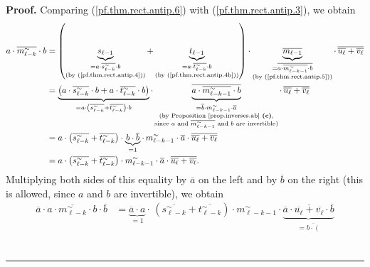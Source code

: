 \documentclass[numbers=enddot,12pt,final,onecolumn,notitlepage]{scrartcl}%
\theoremstyle{definition}
\newenvironment{verlong}{}{}
\newenvironment{proof}[1][Proof]{\noindent\textbf{#1.} }{\ \rule{0.5em}{0.5em}}
\begin{document}
\begin{verlong}
\begin{proof}
Comparing (\ref{pf.thm.rect.antip.6}) with (\ref{pf.thm.rect.antip.3}), we
obtain%
\begin{align*}
a\cdot\overline{m_{\ell-k}^{\sim}}\cdot b  &  =\left(  \underbrace{s_{\ell-1}%
}_{\substack{=a\cdot\overline{s_{\ell-k}^{\sim}}\cdot b\\\text{(by
(\ref{pf.thm.rect.antip.4}))}}}+\underbrace{t_{\ell-1}}_{\substack{=a\cdot
\overline{t_{\ell-k}^{\sim}}\cdot b\\\text{(by (\ref{pf.thm.rect.antip.4b}))}%
}}\right)  \cdot\underbrace{\overline{m_{\ell-1}}}_{\substack{=\overline
{a\cdot\overline{m_{\ell-k-1}^{\sim}}\cdot b}\\\text{(by
(\ref{pf.thm.rect.antip.5}))}}}\cdot\,\overline{\overline{u_{\ell}}%
+\overline{v_{\ell}}}\\
&  =\underbrace{\left(  a\cdot\overline{s_{\ell-k}^{\sim}}\cdot b+a\cdot
\overline{t_{\ell-k}^{\sim}}\cdot b\right)  }_{=a\cdot\left(  \overline
{s_{\ell-k}^{\sim}}+\overline{t_{\ell-k}^{\sim}}\right)  \cdot b}%
\cdot\underbrace{\overline{a\cdot\overline{m_{\ell-k-1}^{\sim}}\cdot b}%
}_{\substack{=\overline{b}\cdot m_{\ell-k-1}^{\sim}\cdot\overline
{a}\\\text{(by Proposition \ref{prop.inverses.ab} \textbf{(c)},}\\\text{since
}a\text{ and }\overline{m_{\ell-k-1}^{\sim}}\text{ and }b\text{ are
invertible)}}}\cdot\,\overline{\overline{u_{\ell}}+\overline{v_{\ell}}}\\
&  =a\cdot\left(  \overline{s_{\ell-k}^{\sim}}+\overline{t_{\ell-k}^{\sim}%
}\right)  \cdot\underbrace{b\cdot\overline{b}}_{=1}\cdot\,m_{\ell-k-1}^{\sim
}\cdot\overline{a}\cdot\overline{\overline{u_{\ell}}+\overline{v_{\ell}}}\\
&  =a\cdot\left(  \overline{s_{\ell-k}^{\sim}}+\overline{t_{\ell-k}^{\sim}%
}\right)  \cdot m_{\ell-k-1}^{\sim}\cdot\overline{a}\cdot\overline
{\overline{u_{\ell}}+\overline{v_{\ell}}}.
\end{align*}
Multiplying both sides of this equality by $\overline{a}$ on the left and by
$\overline{b}$ on the right (this is allowed, since $a$ and $b$ are
invertible), we obtain%
\begin{align*}
\overline{a}\cdot a\cdot\overline{m_{\ell-k}^{\sim}}\cdot b\cdot\overline{b}
&  =\underbrace{\overline{a}\cdot a}_{=1}\cdot\,\left(  \overline{s_{\ell
-k}^{\sim}}+\overline{t_{\ell-k}^{\sim}}\right)  \cdot m_{\ell-k-1}^{\sim
}\cdot\underbrace{\overline{a}\cdot\overline{\overline{u_{\ell}}%
+\overline{v_{\ell}}}\cdot\overline{b}}_{\substack{=\overline{b\cdot\left(
}}}
\end{align*}
\end{proof}
\end{verlong}
\end{document}
